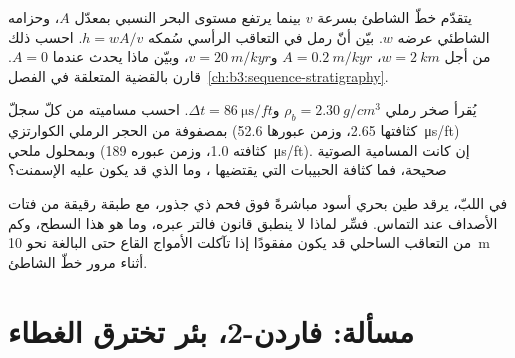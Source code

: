 \begin{exercise}[$\star\star\star$]\label{exo:b3:facies-models:10}
يتقدّم خطّ الشاطئ بسرعة $v$ بينما يرتفع مستوى البحر النسبي بمعدّل
$A$، وحزامه الشاطئي عرضه $w$. بيّن أنّ رمل  في التعاقب
الرأسي سُمكه $h = wA/v$. احسب ذلك من أجل $w = \qty{2}{km}$،
$A = \qty{0.2}{m/kyr}$ و$v = \qty{20}{m/kyr}$، وبيّن ماذا يحدث عندما
$A = 0$. قارن بالقضية المتعلقة  في
الفصل~\ref{ch:b3:sequence-stratigraphy}.
\end{exercise}

\begin{exercise}[$\star\star\star$]\label{exo:b3:facies-models:11}
يُقرأ صخر رملي $\rho_b = \qty{2.30}{g/cm^3}$ و$\Delta t =
\qty{86}{\micro\second/ft}$. احسب مساميته من كلّ سجلّ بمصفوفة من الحجر الرملي الكوارتزي
(كثافتها 2.65، وزمن عبورها \qty{52.6}{\micro\second/ft}) وبمحلول ملحي (كثافته 1.0،
وزمن عبوره \qty{189}{\micro\second/ft}). إن كانت المسامية الصوتية صحيحة، فما
كثافة الحبيبات التي يقتضيها ، وما الذي قد يكون عليه الإسمنت؟
\end{exercise}

\begin{exercise}[$\star\star\star$]\label{exo:b3:facies-models:12}
في اللبّ، يرقد طين بحري أسود مباشرةً فوق فحم ذي جذور، مع طبقة رقيقة
من فتات الأصداف عند التماس. فسِّر لماذا لا ينطبق قانون فالتر عبره، وما هو هذا السطح،
وكم من التعاقب الساحلي قد يكون مفقودًا
إذا تآكلت الأمواج القاع حتى  البالغة نحو \qty{10}{m}
أثناء مرور خطّ الشاطئ.
\end{exercise}

\section{مسألة: فاردن-2، بئر تخترق الغطاء}

